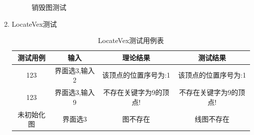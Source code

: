 \documentclass[supercite]{HustGraduPaper}
\theoremstyle{definition}
\begin{document}
\begin{enumerate}
\begin{figure}[htb]
		      \caption{销毁图测试}
	      \end{figure}
	      \newpage
	\item LocateVex测试
	      \begin{table}[htb]
		      \begin{center}
			      \setlength{\tabcolsep}{2.0mm}
			      \caption{LocateVex测试用例表}
			      \label{t3}
			      \begin{tabular}{|c|c|c|c|}
				      \hline
				      测试用例   & 输入          & 理论结果               & 测试结果               \\
				      \hline
				      \hline
				      123        & 界面选3,输入2 & 该顶点的位置序号为:1   & 该顶点的位置序号为:1   \\
				      \hline
				      123        & 界面选3,输入9 & 不存在关键字为9的顶点! & 不存在关键字为9的顶点! \\
				      \hline
				      未初始化图 & 界面选3       & 图不存在               & 线图不存在             \\
				      \hline
			      \end{tabular}
		      \end{center}
	      \end{table}
	      \begin{figure}[htb]
		      \centering
		      \quad
		      \quad
		      \\

\end{figure}
\end{enumerate}
\end{document}
